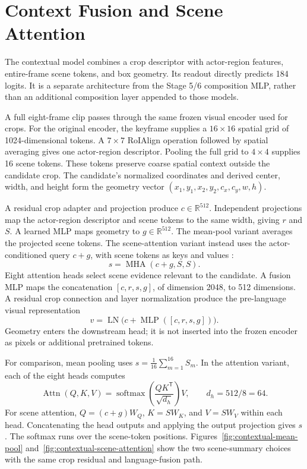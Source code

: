 \section{Context Fusion and Scene Attention}

The contextual model combines a crop descriptor with actor-region features, entire-frame scene tokens, and box geometry. Its readout directly predicts 184 logits. It is a separate architecture from the Stage 5/6 composition MLP, rather than an additional composition layer appended to those models.

A full eight-frame clip passes through the same frozen visual encoder used for crops. For the original encoder, the keyframe supplies a \(16\times16\) spatial grid of 1024-dimensional tokens. A \(7\times7\) RoIAlign operation followed by spatial averaging gives one actor-region descriptor. Pooling the full grid to \(4\times4\) supplies 16 scene tokens. These tokens preserve coarse spatial context outside the candidate crop. The candidate's normalized coordinates and derived center, width, and height form the geometry vector \((x_1,y_1,x_2,y_2,c_x,c_y,w,h)\).

A residual crop adapter and projection produce \(c\in\mathbb{R}^{512}\). Independent projections map the actor-region descriptor and scene tokens to the same width, giving \(r\) and \(S\). A learned MLP maps geometry to \(g\in\mathbb{R}^{512}\). The mean-pool variant averages the projected scene tokens. The scene-attention variant instead uses the actor-conditioned query \(c+g\), with scene tokens as keys and values \cite{attention}:
\begin{equation}\label{eq:scene-attention}
 s=\operatorname{MHA}(c+g,S,S).
\end{equation}
Eight attention heads select scene evidence relevant to the candidate. A fusion MLP maps the concatenation \([c,r,s,g]\), of dimension 2048, to 512 dimensions. A residual crop connection and layer normalization produce the pre-language visual representation
\begin{equation}\label{eq:visual-fusion}
 v=\operatorname{LN}\big(c+\operatorname{MLP}([c,r,s,g])\big).
\end{equation}
Geometry enters the downstream head; it is not inserted into the frozen encoder as pixels or additional pretrained tokens.

For comparison, mean pooling uses \(s=\frac{1}{16}\sum_{m=1}^{16}S_m\). In the attention variant, each of the eight heads computes
\begin{equation}\label{eq:attention}
 \operatorname{Attn}(Q,K,V)=\operatorname{softmax}\!\left(\frac{QK^{\mathsf T}}{\sqrt{d_h}}\right)V,
 \qquad d_h=512/8=64.
\end{equation}
For scene attention, \(Q=(c+g)W_Q\), \(K=SW_K\), and \(V=SW_V\) within each head. Concatenating the head outputs and applying the output projection gives \(s\). The softmax runs over the scene-token positions. Figures~\ref{fig:contextual-mean-pool} and~\ref{fig:contextual-scene-attention} show the two scene-summary choices with the same crop residual and language-fusion path.

